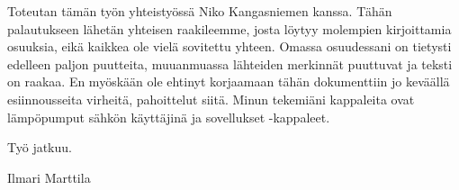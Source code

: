 Toteutan tämän työn yhteistyössä Niko Kangasniemen kanssa. Tähän palautukseen lähetän yhteisen raakileemme, josta löytyy molempien kirjoittamia osuuksia, eikä kaikkea ole vielä sovitettu yhteen. Omassa osuudessani on tietysti edelleen paljon puutteita, muuanmuassa lähteiden merkinnät puuttuvat ja teksti on raakaa. En myöskään ole ehtinyt korjaamaan tähän dokumenttiin jo keväällä esiinnousseita virheitä, pahoittelut siitä. Minun tekemiäni kappaleita ovat lämpöpumput sähkön käyttäjinä ja sovellukset -kappaleet.

Työ jatkuu.

Ilmari Marttila
